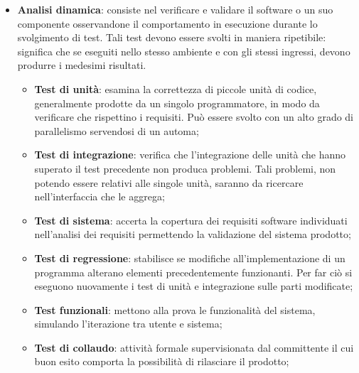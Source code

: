 {\begin{itemize}
\begin{itemize}
		\end{itemize}
		
		\item \textbf{Analisi dinamica}: consiste nel verificare e validare il software o un suo componente osservandone il comportamento in esecuzione durante lo svolgimento di test. Tali test devono essere svolti in maniera ripetibile: significa che se eseguiti nello stesso ambiente e con gli stessi ingressi, devono produrre i medesimi risultati.
		\begin{itemize}
			\item \textbf{Test di unità}: esamina la correttezza di piccole unità di codice, generalmente prodotte da un singolo programmatore, in modo da verificare che  rispettino i requisiti. Può essere svolto con un alto grado di parallelismo servendosi di un automa;		
			\item \textbf{Test di integrazione}: verifica che l'integrazione delle unità che hanno superato il test precedente non produca problemi. Tali problemi, non potendo essere relativi alle singole unità, saranno da ricercare nell'interfaccia che le aggrega;	
			\item \textbf{Test di sistema}: accerta la copertura dei requisiti\ped{g} software individuati nell'analisi dei requisiti permettendo la validazione del sistema prodotto;
			\item \textbf{Test di regressione}: stabilisce se modifiche all'implementazione di un programma alterano elementi precedentemente funzionanti. Per far ciò si eseguono nuovamente i test di unità e integrazione sulle parti modificate;			
			\item \textbf{Test funzionali}: mettono alla prova le funzionalità del sistema, simulando l'iterazione tra utente e sistema;				
			\item \textbf{Test di collaudo}: attività formale supervisionata dal committente il cui buon esito comporta la possibilità di rilasciare il prodotto;
		\end{itemize}
	\end{itemize}
	}
